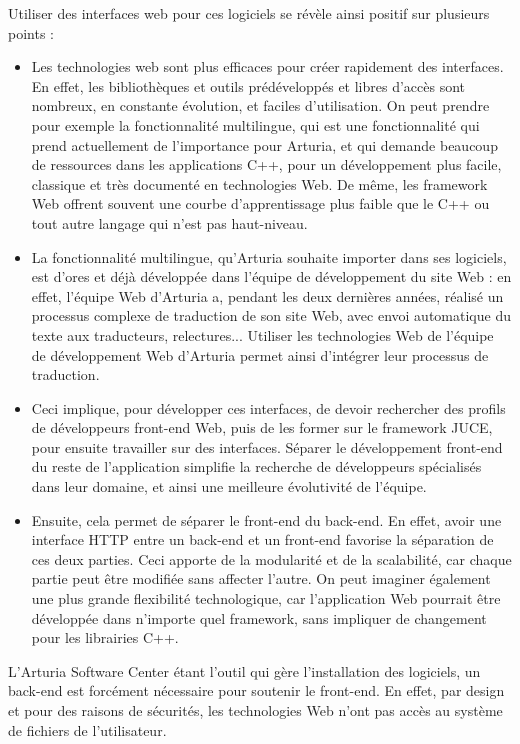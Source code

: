 \documentclass[francais]{rapportPFE}  %
\begin{document}
Utiliser des interfaces web pour ces logiciels se révèle ainsi positif sur plusieurs points : 
\begin{itemize}
	\item Les technologies web sont plus efficaces pour créer rapidement des interfaces. En effet, les bibliothèques et outils prédéveloppés et libres d'accès sont nombreux, en constante évolution, et faciles d'utilisation. On peut prendre pour exemple la fonctionnalité multilingue, qui est une fonctionnalité qui prend actuellement de l'importance pour Arturia, et qui demande beaucoup de ressources dans les applications C++, pour un développement plus facile, classique et très documenté en technologies Web. De même, les framework Web offrent souvent une courbe d'apprentissage plus faible que le C++ ou tout autre langage qui n'est pas haut-niveau.
	\item La fonctionnalité multilingue, qu'Arturia souhaite importer dans ses logiciels, est d'ores et déjà développée dans l'équipe de développement du site Web : en effet, l'équipe Web d'Arturia a, pendant les deux dernières années, réalisé un processus complexe de traduction de son site Web, avec envoi automatique du texte aux traducteurs, relectures... Utiliser les technologies Web de l'équipe de développement Web d'Arturia permet ainsi d'intégrer leur processus de traduction.
	\item Ceci implique, pour développer ces interfaces, de devoir rechercher des profils de développeurs front-end Web, puis de les former sur le framework JUCE, pour ensuite travailler sur des interfaces. Séparer le développement front-end du reste de l'application simplifie la recherche de développeurs spécialisés dans leur domaine, et ainsi une meilleure évolutivité de l'équipe.
	\item Ensuite, cela permet de séparer le front-end du back-end. En effet, avoir une interface HTTP entre un back-end et un front-end favorise la séparation de ces deux parties. Ceci apporte de la modularité et de la scalabilité, car chaque partie peut être modifiée sans affecter l'autre. On peut imaginer également une plus grande flexibilité technologique, car l'application Web pourrait être développée dans n'importe quel framework, sans impliquer de changement pour les librairies C++.
\end{itemize}

L'Arturia Software Center étant l'outil qui gère l'installation des logiciels, un back-end est forcément nécessaire pour soutenir le front-end. En effet, par design et pour des raisons de sécurités, les technologies Web n'ont pas accès au système de fichiers de l'utilisateur.
\end{document}
